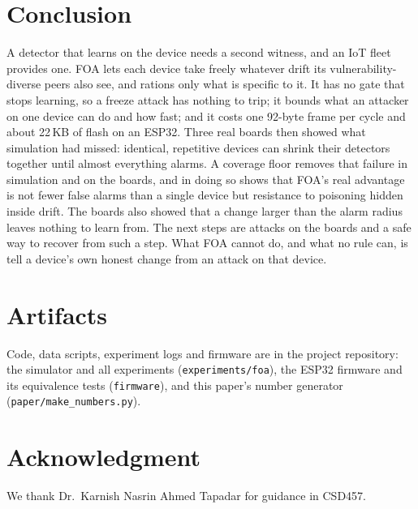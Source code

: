 \section{Conclusion}
A detector that learns on the device needs a second witness, and an IoT fleet provides one. FOA lets
each device take freely whatever drift its vulnerability-diverse peers also see, and rations only what
is specific to it. It has no gate that stops learning, so a freeze attack has nothing to trip; it bounds what an attacker on one
device can do and how fast; and it costs one 92-byte frame per cycle and about 22\,KB of flash on an
ESP32. Three real boards then showed what simulation had missed: identical, repetitive devices can shrink
their detectors together until almost everything alarms. A coverage floor removes that failure in
simulation and on the boards, and in doing so shows that FOA's real advantage is not fewer false alarms than a single
device but resistance to poisoning hidden inside drift. The boards also showed that a change larger than the alarm radius
leaves nothing to learn from. The next steps are attacks on the boards and a safe way to recover from
such a step. What FOA cannot do, and what no rule can, is tell a device's own honest change from an attack
on that device.

\section*{Artifacts}
Code, data scripts, experiment logs and firmware are in the project repository: the simulator and all
experiments (\texttt{experiments/foa}), the ESP32 firmware and its equivalence tests
(\texttt{firmware}), and this paper's number generator (\texttt{paper/make\_numbers.py}).

\section*{Acknowledgment}
We thank Dr.~Karnish Nasrin Ahmed Tapadar for guidance in CSD457.
